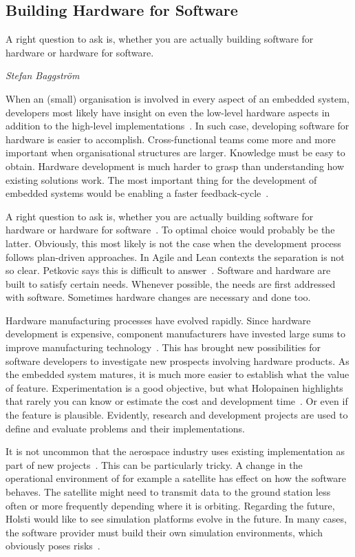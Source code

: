 \documentclass[english]{tktltiki2}
\begin{document}
\subsection{Building Hardware for Software}

\epigraph{A right question to ask is, whether you are actually building software for hardware or hardware for software.}{\textit{Stefan Baggström~\cite{BT15}}}

When an (small) organisation is involved in every aspect of an embedded system, developers most likely have insight on even the low-level hardware aspects in addition to the high-level implementations~\cite{Kri15}. In such case, developing software for hardware is easier to accomplish. Cross-functional teams come more and more important when organisational structures are larger. Knowledge must be easy to obtain. Hardware development is much harder to grasp than understanding how existing solutions work. The most important thing for the development of embedded systems would be enabling a faster feedback-cycle~\cite{BT15}.

A right question to ask is, whether you are actually building software for hardware or hardware for software~\cite{BT15}. To optimal choice would probably be the latter. Obviously, this most likely is not the case when the development process follows plan-driven approaches. In Agile and Lean contexts the separation is not so clear. Petkovic says this is difficult to answer~\cite{Pet15}. Software and hardware are built to satisfy certain needs. Whenever possible, the needs are first addressed with software. Sometimes hardware changes are necessary and done too.

Hardware manufacturing processes have evolved rapidly. Since hardware development is expensive, component manufacturers have invested large sums to improve manufacturing technology~\cite{Hol15a}. This has brought new possibilities for software developers to investigate new prospects involving hardware products. As the embedded system matures, it is much more easier to establish what the value of feature. Experimentation is a good objective, but what Holopainen highlights that rarely you can know or estimate the cost and development time~\cite{Hol15a}. Or even if the feature is plausible. Evidently, research and development projects are used to define and evaluate problems and their implementations.

It is not uncommon that the aerospace industry uses existing implementation as part of new projects~\cite{Hol15b}. This can be particularly tricky. A change in the operational environment of for example a satellite has effect on how the software behaves. The satellite might need to transmit data to the ground station less often or more frequently depending where it is orbiting. Regarding the future, Holsti would like to see simulation platforms evolve in the future. In many cases, the software provider must build their own simulation environments, which obviously poses risks~\cite{Hol15b}.
\end{document}
